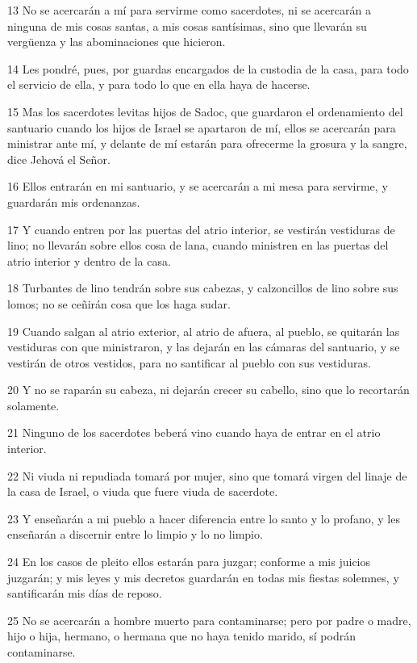 \par 13 No se acercarán a mí para servirme como sacerdotes, ni se acercarán a ninguna de mis cosas santas, a mis cosas santísimas, sino que llevarán su vergüenza y las abominaciones que hicieron.
\par 14 Les pondré, pues, por guardas encargados de la custodia de la casa, para todo el servicio de ella, y para todo lo que en ella haya de hacerse.
\par 15 Mas los sacerdotes levitas hijos de Sadoc, que guardaron el ordenamiento del santuario cuando los hijos de Israel se apartaron de mí, ellos se acercarán para ministrar ante mí, y delante de mí estarán para ofrecerme la grosura y la sangre, dice Jehová el Señor.
\par 16 Ellos entrarán en mi santuario, y se acercarán a mi mesa para servirme, y guardarán mis ordenanzas.
\par 17 Y cuando entren por las puertas del atrio interior, se vestirán vestiduras de lino; no llevarán sobre ellos cosa de lana, cuando ministren en las puertas del atrio interior y dentro de la casa.
\par 18 Turbantes de lino tendrán sobre sus cabezas, y calzoncillos de lino sobre sus lomos; no se ceñirán cosa que los haga sudar.
\par 19 Cuando salgan al atrio exterior, al atrio de afuera, al pueblo, se quitarán las vestiduras con que ministraron, y las dejarán en las cámaras del santuario, y se vestirán de otros vestidos, para no santificar al pueblo con sus vestiduras.
\par 20 Y no se raparán su cabeza, ni dejarán crecer su cabello, sino que lo recortarán solamente.
\par 21 Ninguno de los sacerdotes beberá vino cuando haya de entrar en el atrio interior. 
\par 22 Ni viuda ni repudiada tomará por mujer, sino que tomará virgen del linaje de la casa de Israel, o viuda que fuere viuda de sacerdote. 
\par 23 Y enseñarán a mi pueblo a hacer diferencia entre lo santo y lo profano, y les enseñarán a discernir entre lo limpio y lo no limpio. 
\par 24 En los casos de pleito ellos estarán para juzgar; conforme a mis juicios juzgarán; y mis leyes y mis decretos guardarán en todas mis fiestas solemnes, y santificarán mis días de reposo.
\par 25 No se acercarán a hombre muerto para contaminarse; pero por padre o madre, hijo o hija, hermano, o hermana que no haya tenido marido, sí podrán contaminarse.
